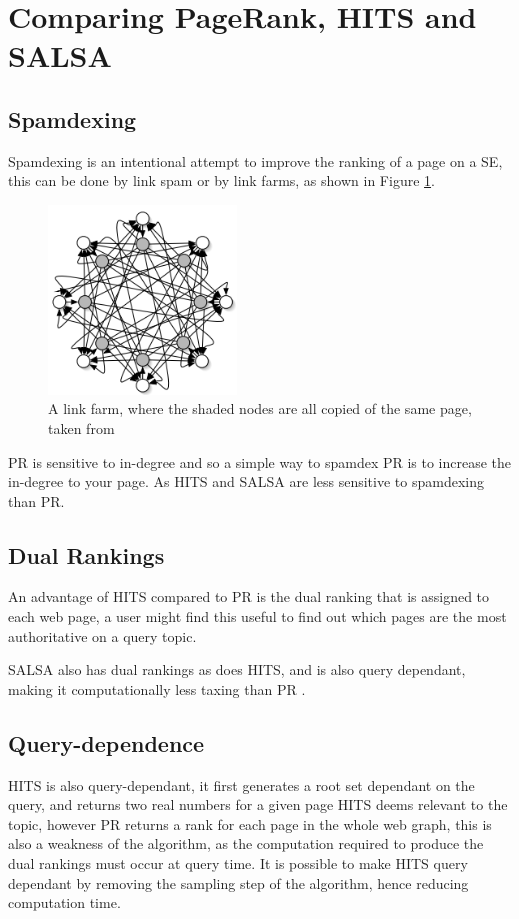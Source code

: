 \documentclass[11pt]{report}
\begin{document}
{\section{Comparing PageRank, HITS and SALSA} \label{sec:compare}
\subsection{Spamdexing}
Spamdexing is an intentional attempt to improve the ranking of a page on a SE, this can be done by link spam or by link farms, as shown in Figure \ref{fig:link farm}. 
\begin{figure}[h!]
\centering
\includegraphics[width=5cm]{link_farm_baldi.png}
\caption{A link farm, where the shaded nodes are all copied of the same page, taken from \cite{baldi2003modeling}}
\label{fig:link farm}
\end{figure}

PR is sensitive to in-degree and so a simple way to spamdex PR is to increase the in-degree to your page. \cite{bonato} As HITS and SALSA are less sensitive to spamdexing than PR. 

\subsection{Dual Rankings}
An advantage of HITS compared to PR is the dual ranking that is assigned to each web page, a user might find this useful to find out which pages are the most authoritative on a query topic.

SALSA also has dual rankings as does HITS, and is also query dependant, making it computationally less taxing than PR \cite{langville}.


\subsection{Query-dependence}
HITS is also query-dependant, it first generates a root set dependant on the query, and returns two real numbers for a given page HITS deems relevant to the topic, however PR returns a rank for each page in the whole web graph, this is also a weakness of the algorithm, as the computation required to produce the dual rankings must occur at query time. It is possible to make HITS query dependant by removing the sampling step of the algorithm, hence reducing computation time. 

}
\end{document}
